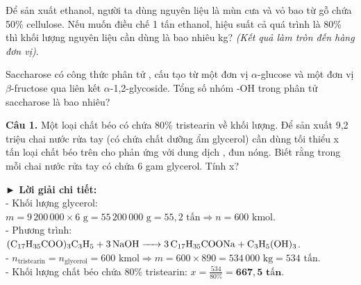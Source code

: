 \documentclass[11pt,a4paper]{article}
\begin{document}
\begin{ex}
Để sản xuất ethanol, người ta dùng nguyên liệu là mùn cưa và vỏ bao từ gỗ chứa 50\% cellulose. Nếu muốn điều chế 1 tấn ethanol, hiệu suất cả quá trình là 80\% thì khối lượng nguyên liệu cần dùng là bao nhiêu kg? \textit{(Kết quả làm tròn đến hàng đơn vị)}.
\end{ex}

\begin{ex}
Saccharose có công thức phân tử , cấu tạo từ một đơn vị $\alpha$-glucose và một đơn vị $\beta$-fructose qua liên kết $\alpha$-1,2-glycoside. Tổng số nhóm -OH trong phân tử saccharose là bao nhiêu?
\end{ex}

\vspace{6pt}
\vspace{4pt}

\noindent\textbf{Câu 1.} Một loại chất béo có chứa 80\% tristearin về khối lượng. Để sản xuất 9,2 triệu chai nước rửa tay (có chứa chất dưỡng ẩm glycerol) cần dùng tối thiểu x tấn loại chất béo trên cho phản ứng với dung dịch , đun nóng. Biết rằng trong mỗi chai nước rửa tay có chứa 6 gam glycerol. Tính x?

\begin{tcolorbox}[colback=white,colframe=solBlue,arc=1mm,boxrule=0.5pt,top=2mm,bottom=2mm,left=3mm,right=3mm]
{\color{solBlue}\textbf{► Lời giải chi tiết:}}\\
- Khối lượng glycerol: $m = 9\,200\,000 \times 6\text{ g} = 55\,200\,000\text{ g} = 55{,}2\text{ tấn} \Rightarrow n = 600\text{ kmol}$.\\
- Phương trình: $\ce{(C17H35COO)3C3H5 + 3NaOH -> 3C17H35COONa + C3H5(OH)3}$.\\
- $n_{\text{tristearin}} = n_{\text{glycerol}} = 600\text{ kmol} \Rightarrow m = 600 \times 890 = 534\,000\text{ kg} = 534\text{ tấn}$.\\
- Khối lượng chất béo chứa 80\% tristearin: $x = \frac{534}{80\%} = \mathbf{667{,}5\text{ tấn}}$.
\end{tcolorbox}
\end{document}
